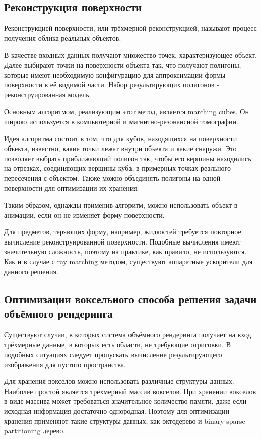 \subsection{Реконструкция поверхности}

Реконструкцией поверхности, или трёхмерной реконструкцией, называют процесс
получения облика реальных объектов.

В качестве входных данных получают множество точек, характеризующее объект.
Далее выбирают точки на поверхности объекта так, что получают полигоны, которые
имеют необходимую конфигурацию для аппроксимации формы поверхности в её видимой части.
Набор результирующих полигонов - реконструированная модель.

Основным алгоритмом, реализующим этот метод, является marching cubes.
Он широко используется в компьютерной и магнитно-резонансной томографии\cite{site:marchingcubes}.

Идея алгоритма состоит в том, что для кубов, находящихся на поверхности объекта, известно,
какие точки лежат внутри объекта и какие снаружи. Это позволяет выбрать
приближающий полигон так, чтобы его вершины находились на отрезках, соединяющих вершины куба,
в примерных точках реального пересечения с объектом. Также можно объединять полигоны на одной поверхности
для оптимизации их хранения.

Таким образом, однажды применив алгоритм, можно использовать объект в анимации, если
он не изменяет форму поверхности.

Для предметов, теряющих форму, например, жидкостей требуется повторное вычисление
реконструированной поверхности. Подобные вычисления имеют значительную сложность,
поэтому на практике, как правило, не используются\cite{book:ash}. Как и в случае
с ray marching методом, существуют аппаратные ускорители для данного решения\cite{site:gvdb}.

\subsection{Оптимизации воксельного способа решения задачи объёмного рендеринга}

Существуют случаи, в которых система объёмного рендеринга получает на вход трёхмерные данные, в
 которых есть области, не требующие отрисовки. В подобных ситуациях следует пропускать вычисление
 результирующего изображения для пустого пространства\cite{article:asvo}.

Для хранения вокселов можно использовать различные структуры данных. Наиболее простой является
трёхмерный массив вокселов. При хранении вокселов в виде массива может требоваться значительное
количество памяти, даже если исходная информация достаточно однородная.
Поэтому для оптимизации хранения применяют такие структуры данных, как октодерево и binary sparse
partitioning дерево\cite{article:asvo}.


